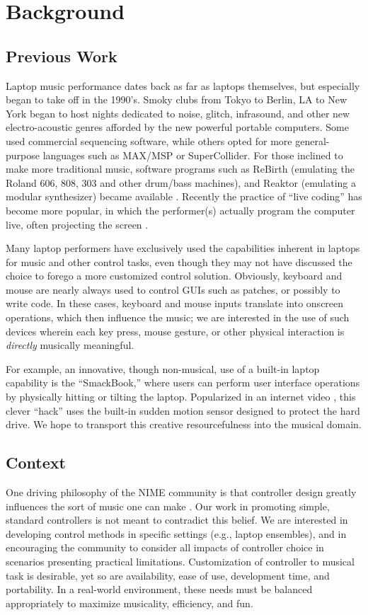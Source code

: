 \section{Background}
\subsection{Previous Work}
Laptop music performance dates back as far as laptops themselves, but especially
began to take off in the 1990's.  Smoky clubs from Tokyo to Berlin, LA to New
York began to host nights dedicated to noise, glitch, infrasound, and other new
electro-acoustic genres afforded by the new powerful portable computers. Some
used commercial sequencing software, while others opted for more general-purpose
languages such as MAX/MSP or SuperCollider.  For those inclined to make more
traditional music, software programs such as ReBirth (emulating the Roland 606,
808, 303 and other drum/bass machines), and Reaktor (emulating a modular
synthesizer) became available \cite{Loubet:2000,Weidenbaum:2006}. Recently the practice of ``live coding''
has become more popular, in which the performer(s) actually program the computer
live, often projecting the screen \cite{Wang:2004}.

Many laptop performers have exclusively used the capabilities inherent in
laptops for music and other control tasks, even though they may not have
discussed the choice to forego a more customized control solution. Obviously,
keyboard and mouse are nearly always used to control GUIs such as patches, or
possibly to write code. In these cases, keyboard and mouse inputs translate into
onscreen operations, which then influence the music; we are interested in the use
of such devices wherein each key press, mouse gesture, or other physical
interaction is \textit{directly} musically meaningful.

For example, an innovative, though non-musical, use of a built-in laptop
capability is the ``SmackBook,'' where users can perform user interface
operations by physically hitting or tilting the laptop. Popularized in an
internet video \cite{Ellingsen:2006}, this clever ``hack'' uses the built-in sudden motion sensor
designed to protect the hard drive. We hope to transport this creative
resourcefulness into the musical domain.

\subsection{Context}
One driving philosophy of the NIME community is that controller design greatly
influences the sort of music one can make \cite{Cook:2001}. Our work in promoting simple,
standard controllers is not meant to contradict this belief. We are interested in
developing control methods in specific settings (e.g., laptop ensembles), and in
encouraging the community to consider all impacts of controller choice in
scenarios presenting practical limitations. Customization of controller to
musical task is desirable, yet so are availability, ease of use, development
time, and portability. In a real-world environment, these needs must be balanced
appropriately to maximize musicality, efficiency, and fun.


